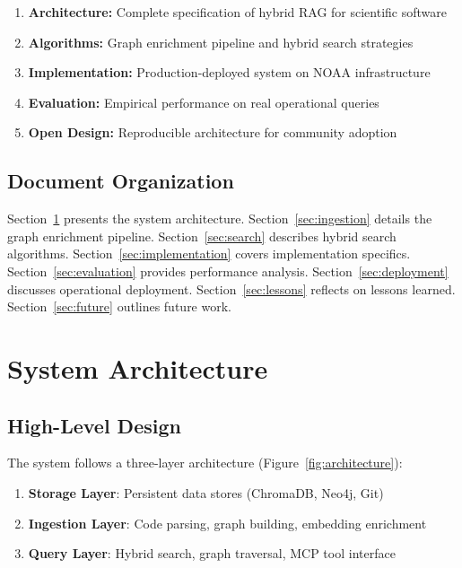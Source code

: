 \documentclass[11pt,letterpaper]{article}
\begin{document}
\begin{enumerate}
    \item \textbf{Architecture:} Complete specification of hybrid RAG for scientific software
    \item \textbf{Algorithms:} Graph enrichment pipeline and hybrid search strategies
    \item \textbf{Implementation:} Production-deployed system on NOAA infrastructure
    \item \textbf{Evaluation:} Empirical performance on real operational queries
    \item \textbf{Open Design:} Reproducible architecture for community adoption
\end{enumerate}

\subsection{Document Organization}

Section~\ref{sec:architecture} presents the system architecture. Section~\ref{sec:ingestion} details the graph enrichment pipeline. Section~\ref{sec:search} describes hybrid search algorithms. Section~\ref{sec:implementation} covers implementation specifics. Section~\ref{sec:evaluation} provides performance analysis. Section~\ref{sec:deployment} discusses operational deployment. Section~\ref{sec:lessons} reflects on lessons learned. Section~\ref{sec:future} outlines future work.

\section{System Architecture}
\label{sec:architecture}

\subsection{High-Level Design}

The system follows a three-layer architecture (Figure~\ref{fig:architecture}):

\begin{enumerate}
    \item \textbf{Storage Layer}: Persistent data stores (ChromaDB, Neo4j, Git)
    \item \textbf{Ingestion Layer}: Code parsing, graph building, embedding enrichment
    \item \textbf{Query Layer}: Hybrid search, graph traversal, MCP tool interface
\end{enumerate}
\end{document}
